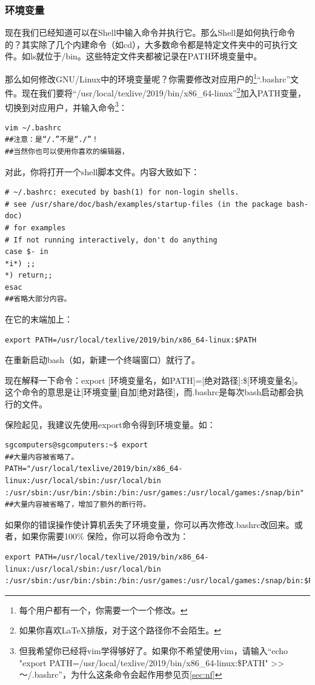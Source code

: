 \documentclass{book}
\begin{document}
\subsubsection{环境变量}
现在我们已经知道可以在Shell中输入命令并执行它。那么Shell是如何执行命令的？其实除了几个内建命令（如cd），大多数命令都是特定文件夹中的可执行文件。如ls就位于/bin。这些特定文件夹都被记录在PATH环境变量中。\par
那么如何修改GNU/Linux中的环境变量呢？你需要修改对应用户的\footnote{每个用户都有一个，你需要一个一个修改。}“.bashrc”文件。现在我们要将“/usr/local/texlive/2019/bin/x86\_64-linux”\footnote{如果你喜欢\LaTeX 排版，对于这个路径你不会陌生。}加入PATH变量，切换到对应用户，并输入命令\footnote{但我希望你已经将vim学得够好了。如果你不希望使用vim，请输入“echo "export PATH=/usr/local/texlive/2019/bin/x86\_64-linux:\$PATH" >> ～/.bashrc”，为什么这条命令会起作用参见\pageref{sec:nf}页\ref{sec:nf}}：
\begin{verbatim}
vim ~/.bashrc
##注意：是“/.”不是“./”！
##当然你也可以使用你喜欢的编辑器，
\end{verbatim}
对此，你将打开一个shell脚本文件。内容大致如下：
\begin{verbatim}
# ~/.bashrc: executed by bash(1) for non-login shells.
# see /usr/share/doc/bash/examples/startup-files (in the package bash-doc)
# for examples
# If not running interactively, don't do anything
case $- in
*i*) ;;
*) return;;
esac
##省略大部分内容。
\end{verbatim}
在它的末端加上：
\begin{verbatim}
export PATH=/usr/local/texlive/2019/bin/x86_64-linux:$PATH
\end{verbatim}
在重新启动bash（如，新建一个终端窗口）就行了。\par
现在解释一下命令：export [环境变量名，如PATH]=[绝对路径]:\$[环境变量名]。这个命令的意思是让[环境变量]自加[绝对路径]，而.bashrc是每次bash启动都会执行的文件。\par
保险起见，我建议先使用export命令得到环境变量。如：
\begin{verbatim}
sgcomputers@sgcomputers:~$ export
##大量内容被省略了。
PATH="/usr/local/texlive/2019/bin/x86_64-linux:/usr/local/sbin:/usr/local/bin
:/usr/sbin:/usr/bin:/sbin:/bin:/usr/games:/usr/local/games:/snap/bin"
##大量内容被省略了，增加了额外的断行符。
\end{verbatim}
如果你的错误操作使计算机丢失了环境变量，你可以再次修改.bashrc改回来。或者，如果你需要100\% 保险，你可以将命令改为：
\begin{verbatim}
export PATH=/usr/local/texlive/2019/bin/x86_64-linux:/usr/local/sbin:/usr/local/bin
:/usr/sbin:/usr/bin:/sbin:/bin:/usr/games:/usr/local/games:/snap/bin:$PATH
\end{verbatim}
\end{document}
